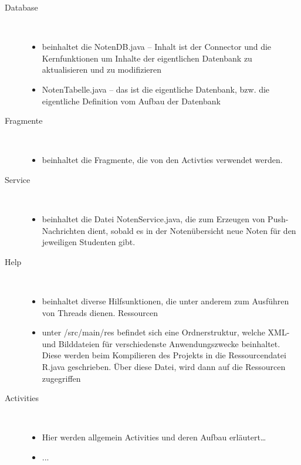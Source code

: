 \begin{description}
\item[Database]~\par
\begin{itemize}
\item beinhaltet die NotenDB.java – Inhalt ist der Connector und die Kernfunktionen um Inhalte der eigentlichen Datenbank zu aktualisieren und zu modifizieren
\item NotenTabelle.java – das ist die eigentliche Datenbank, bzw. die eigentliche Definition vom Aufbau der Datenbank
\end{itemize}

 
\item[Fragmente]~\par
\begin{itemize}
\item beinhaltet die Fragmente, die von den Activties verwendet werden.
\end{itemize}

\item[Service]~\par
\begin{itemize}
\item beinhaltet die Datei NotenService.java, die zum Erzeugen von Push-Nachrichten dient, sobald es in der Notenübersicht neue Noten für den jeweiligen Studenten gibt.
\end{itemize}

 
\item[Help]~\par
\begin{itemize}
\item beinhaltet diverse Hilfsunktionen, die unter anderem zum Ausführen von Threads dienen.
Ressourcen
\item unter /src/main/res befindet sich eine Ordnerstruktur, welche XML- und Bilddateien für verschiedenste Anwendungszwecke beinhaltet. Diese werden beim Kompilieren des Projekts in die Ressourcendatei R.java geschrieben. Über diese Datei, wird dann auf die Ressourcen zugegriffen
\end{itemize}

\item[Activities]~\par
\begin{itemize}
\item Hier werden allgemein Activities und deren Aufbau erläutert…
\item ...
\end{itemize}


\end{description}
